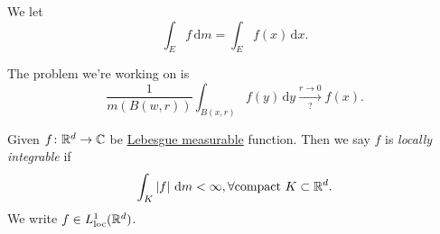 \begin{notation}
	We let
	\[
		\int _E f \,\mathrm{d} m = \int _E f(x) \,\mathrm{d} x.
	\]
\end{notation}

The problem we're working on is
\[
	\frac{1}{m(B(w, r))}\int _{B(x, r)}f(y)\,\mathrm{d} y \overset{r\to 0}{\underset{?}{\longrightarrow}}f(x).
\]
\begin{definition}\label{def:locally-integrable}
	Given \(f\colon \mathbb{\MakeUppercase{r}} ^d \to \mathbb{\MakeUppercase{c}} \) be \hyperref[def:Lebesgue-measurable-function]{Lebesgue measurable}
	function. Then we say \(f\) is \emph{locally integrable} if
	\[
		\int _K \left\vert f \right\vert \,\mathrm{d} m < \infty ,\forall \text{compact } K\subset \mathbb{\MakeUppercase{r}} ^d.
	\]
	We write \(f\in L^1_{\text{loc} }(\mathbb{\MakeUppercase{r}} ^d)\).
\end{definition}

